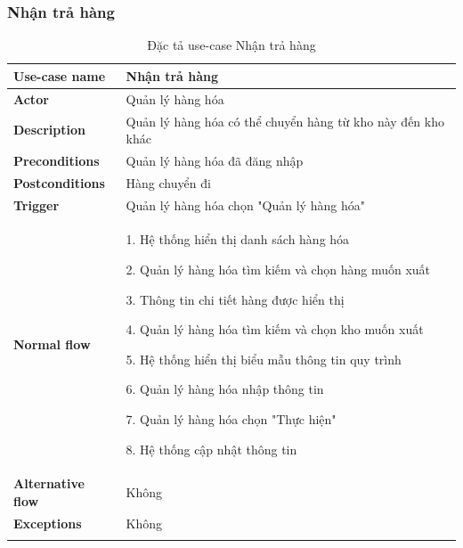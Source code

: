 \subsubsection{Nhận trả hàng}
{
    \setlength\extrarowheight{6pt}
    \begin{longtable}{| p{} | p{} |}
        \hline
        \textbf{Use-case name}
         &
        Nhận trả hàng
        \\
        \hline
        \textbf{Actor}
         &
        Quản lý hàng hóa
        \\
        \hline
        \textbf{Description}
         &
        Quản lý hàng hóa có thể chuyển hàng từ kho này đến kho khác
        \\
        \hline
        \textbf{Preconditions}
         &
        Quản lý hàng hóa đã đăng nhập
        \\
        \hline
        \textbf{Postconditions}
         &
        Hàng chuyển đi
        \\
        \hline
        \textbf{Trigger}
         &
        Quản lý hàng hóa chọn "Quản lý hàng hóa"
        \\
        \hline
        \begin{flushleft}
            \textbf{Normal flow}
        \end{flushleft}
         &
        1. Hệ thống hiển thị danh sách hàng hóa

        2. Quản lý hàng hóa tìm kiếm và chọn hàng muốn xuất

        3. Thông tin chi tiết hàng được hiển thị

        4. Quản lý hàng hóa tìm kiếm và chọn kho muốn xuất

        5. Hệ thống hiển thị biểu mẫu thông tin quy trình

        6. Quản lý hàng hóa nhập thông tin

        7. Quản lý hàng hóa chọn "Thực hiện"

        8. Hệ thống cập nhật thông tin
        \\
        \hline
        \textbf{Alternative flow}
         &
        Không
        \\
        \hline
        \textbf{Exceptions}
         &
        Không
        \\
        \hline
        \caption{Đặc tả use-case Nhận trả hàng}
    \end{longtable}
}

